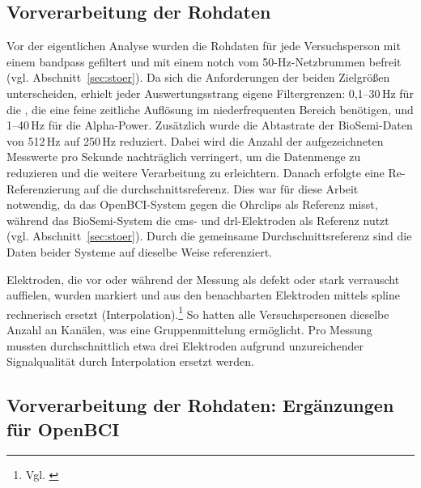 \subsection{Vorverarbeitung der Rohdaten}
\label{sec:vorverarbeitung}
Vor der eigentlichen Analyse wurden die Rohdaten für jede Versuchsperson mit einem \gls{bandpass} gefiltert und mit einem \gls{notch} vom 50-Hz-Netzbrummen befreit (vgl. Abschnitt~\ref{sec:stoer}). Da sich die Anforderungen der beiden Zielgrößen unterscheiden, erhielt jeder Auswertungsstrang eigene Filtergrenzen: 0,1--30\,Hz für die , die eine feine zeitliche Auflösung im niederfrequenten Bereich benötigen, und 1--40\,Hz für die Alpha-Power. Zusätzlich wurde die Abtastrate der BioSemi-Daten von 512\,Hz auf 250\,Hz reduziert. Dabei wird die Anzahl der aufgezeichneten Messwerte pro Sekunde nachträglich verringert, um die Datenmenge zu reduzieren und die weitere Verarbeitung zu erleichtern. Danach erfolgte eine Re-Referenzierung auf die \gls{durchschnittsreferenz}. Dies war für diese Arbeit notwendig, da das OpenBCI-System gegen die Ohrclips als Referenz misst, während das BioSemi-System die \acrshort{cms}- und \acrshort{drl}-Elektroden als Referenz nutzt (vgl. Abschnitt~\ref{sec:stoer}). Durch die gemeinsame Durchschnittsreferenz sind die Daten beider Systeme auf dieselbe Weise referenziert.

Elektroden, die vor oder während der Messung als defekt oder stark verrauscht auffielen, wurden markiert und aus den benachbarten Elektroden mittels \gls{spline} rechnerisch ersetzt (Interpolation).\footnote{Vgl. \cite[S.~8~f.]{bigdelyshamlo2015_prep}} So hatten alle Versuchspersonen dieselbe Anzahl an Kanälen, was eine Gruppenmittelung ermöglicht. Pro Messung mussten durchschnittlich etwa drei Elektroden aufgrund unzureichender Signalqualität durch Interpolation ersetzt werden.

\subsection{Vorverarbeitung der Rohdaten: Ergänzungen für OpenBCI}
\label{sec:openbci_trigger}

